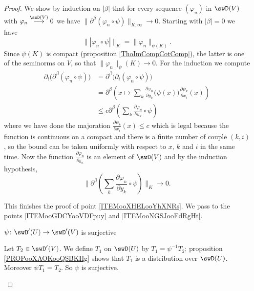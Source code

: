 \begin{proof}
    We show by induction on \( | \beta |\) that for every sequence \( ( \varphi_n)\) in \( \swD(V)\) with \( \varphi_n \stackrel{\swD(V)}{\longrightarrow}0\) we have \(  \| \partial^{\beta}(\varphi_n\circ\psi) \|_{K,\infty}\to 0\). Starting with \( | \beta |=0\) we have
    \begin{equation}
        \| | \varphi_n\circ\psi | \|_K=\| \varphi_n \|_{\psi(K)}.
    \end{equation}
    Since \( \psi(K)\) is compact (proposition \ref{ThoImCompCotComp}), the latter is one of the seminorms on \( V\), so that \( \| \varphi_n \|_\psi(K)\to 0\). For the induction we compute
    \begin{subequations}
        \begin{align}
            \partial_i\big( \partial^{\beta}(\varphi_n\circ\psi) \big)&=\partial^{\beta}\big( \partial_i(\varphi_n\circ\psi) \big)\\
            &=\partial^{\beta}\left(  x\mapsto  \sum_k\frac{ \partial \varphi_n }{ \partial y_k }\big( \psi(x)\big)\frac{ \partial \psi_k }{ \partial x_i }(x) \right)\\
            &\leq c\partial^{\beta}\left( \sum_k\frac{ \partial \varphi_n }{ \partial y_k }\circ\psi \right)
        \end{align}
    \end{subequations}
    where we have done the majoration \( \frac{ \partial \psi_k }{ \partial x_i }(x)\leq c\) which is legal because the function is continuous on a compact and there is a finite number of couple \( (k,i)\), so the bound can be taken uniformly with respect to \( x\), \( k\) and \( i\) in the same time. Now the function \( \frac{ \partial \varphi_n }{ \partial y_n }\) is an element of \( \swD(V)\) and by the induction hypothesis,
    \begin{equation}
       \| \partial^{\beta}\left( \sum_k\frac{ \partial \varphi_n }{ \partial y_k }\circ\psi \right) \|_K\to 0.
    \end{equation}

    This finishes the proof of point \ref{ITEMooXHELooYhXNRs}. We pass to the points \ref{ITEMooGDCYooVDFpuy} and \ref{ITEMooNGSJooEdRgHt}.
    \begin{subproof}
        \item[\( \psi\colon \swD'(U)\to \swD'(V)\) is surjective]

            Let \( T_2\in\swD'(V)\). We define \( T_1\) on \( \swD(U)\) by \( T_1=\psi^{-1} T_2\); proposition \ref{PROPooXAOKooQSBKHg} shows that \( T_1\) is a distribution over \( \swD(U)\). Moreover \( \psi T_1=T_2\). So \( \psi\) is surjective.


\end{subproof}
\end{proof}
